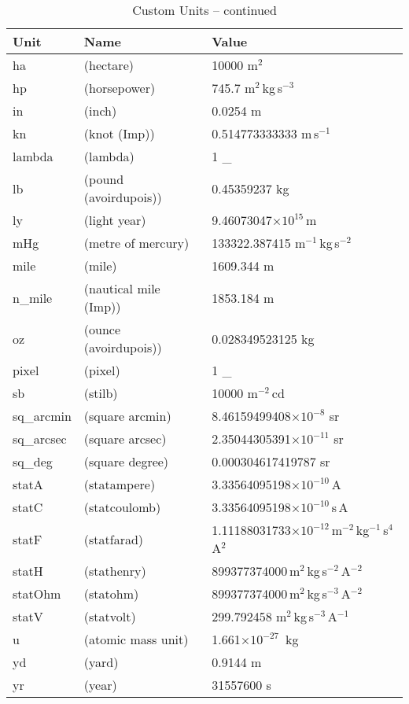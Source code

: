 \begin{table}
\addtocounter{table}{-1}
\caption{Custom Units -- continued}

\begin{center}
\begin{tabular}{lll}
Unit & Name & Value \\
\hline
      ha         & (hectare)                     & 10000 m$^{2}$\\
      hp         & (horsepower)                  & 745.7 m$^{2}$\,kg\,s$^{-3}$\\
      in         & (inch)                        & 0.0254 m\\
      kn         & (knot (Imp))                  & 0.514773333333 m\,s$^{-1}$\\
      lambda     & (lambda)                      & 1 \_\\
      lb         & (pound (avoirdupois))         & 0.45359237 kg\\
      ly         & (light year)                  & 9.46073047$\times10^{15}$\,m\\
      mHg        & (metre of mercury)            & 133322.387415 m$^{-1}$\,kg\,s$^{-2}$\\
      mile       & (mile)                        & 1609.344 m\\
      n\_mile     & (nautical mile (Imp))         & 1853.184 m\\
      oz         & (ounce (avoirdupois))         & 0.028349523125 kg\\
      pixel      & (pixel)                       & 1 \_\\
      sb         & (stilb)                       & 10000 m$^{-2}$\,cd\\
      sq\_arcmin  & (square arcmin)               & 8.46159499408$\times10^{-8}$ sr\\
      sq\_arcsec  & (square arcsec)               & 2.35044305391$\times10^{-11}$ sr\\
      sq\_deg     & (square degree)               & 0.000304617419787 sr\\
      statA      & (statampere)                  & 3.33564095198$\times10^{-10}$\,A\\
      statC      & (statcoulomb)                 & 3.33564095198$\times10^{-10}$\,s\,A\\
      statF      & (statfarad)                   & 1.11188031733$\times10^{-12}$\,m$^{-2}$\,kg$^{-1}$\,s$^{4}$\,A$^{2}$\\
      statH      & (stathenry)                   & 899377374000\,m$^{2}$\,kg\,s$^{-2}$\,A$^{-2}$\\
      statOhm    & (statohm)                     & 899377374000\,m$^{2}$\,kg\,s$^{-3}$\,A$^{-2}$\\
      statV      & (statvolt)                    & 299.792458 m$^{2}$\,kg\,s$^{-3}$\,A$^{-1}$\\
      u          & (atomic mass unit)            & 1.661$\times10^{-27}$\, kg\\
      yd         & (yard)                        & 0.9144 m\\
      yr         & (year)                        & 31557600 s\\


\end{tabular}
\end{center}
\end{table}
